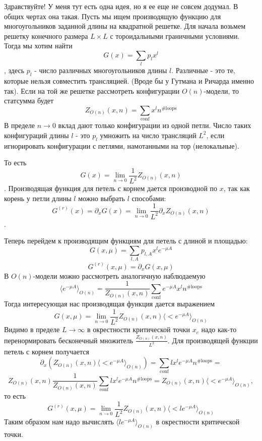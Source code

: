 \documentclass[12pt]{article}
\begin{document}
Здравствуйте!
У меня тут есть одна идея, но я ее еще не совсем додумал. В общих чертах
она такая. Пусть мы ищем производящую функцию для многоугольников
заданной длины на квадратной решетке. Для начала возьмем решетку
конечного размера $L\times L$ с тороидальными граничными условиями. Тогда мы
хотим найти 
$$G(x)=\sum_l p_l x^l$$,
здесь $p_l$ - число различных многоугольников длины $l$. Различные - это
те, которые нельзя совместить трансляцией. (Вроде бы у Гутмана и Ричарда
именно так). 
Если на той же решетке рассмотреть конфигурации $O(n)$-модели, то
статсумма будет
$$Z_{O(n)}(x,n)=\sum_{\mathrm{conf}} x^l n^{\#\mathrm{loops}}$$
В пределе $n\to 0$ вклад дают только конфигурации из одной петли. Число
таких конфигураций длины $l$ - это $p_l$ умножить на число трансляций
$L^2$, если игнорировать конфигурации с петлями, намотанными на тор
(нелокальные). 

То есть 
$$G(x)=\lim_{n\to 0} \frac{1}{L^2} Z_{O(n)}(x,n)$$. 
Производящая функция для петель с корнем дается производной по $x$, так
как корень у петли длины $l$ можно выбрать $l$ способами:
$$G^{(r)}(x)=\partial_x G(x) = \lim_{n\to 0} \frac{1}{L^2} \partial_x
Z_{O(n)} (x,n)$$.

Теперь перейдем к производящим функциям для петель с длиной и площадью:
$$G(x,\mu)=\sum_{l,A} p_{l,A} x^l e^{-\mu A}$$
$$G^{(r)}(x,\mu)=\partial_x G(x,\mu)$$
В $O(n)$-модели можно рассмотреть аналогичную наблюдаемую 
$$\langle e^{-\mu A} \rangle_{O(n)} = \frac{1}{Z_{O(n)} (x,n)}
\sum_{\mathrm{conf}} e^{-\mu A} x^l  n^{\#\mathrm{loops}}$$
Тогда интересующая нас производящая функция дается выражением
$$G(x,\mu)=\lim_{n\to 0} \frac{1}{L^2} Z_{O(n)}(x,n) \langle<e^{-\mu
A}\rangle_{O(n)}$$
Видимо в пределе $L\to \infty$ в окрестности критической точки $x_c$
надо как-то перенормировать бесконечный множитель
$\frac{Z_{O(n)}(x,n)}{L^2}$. 
Для производящей функции петель с корнем получается 
$$\partial_x \left( Z_{O(n)}(x,n) \langle<e^{-\mu
A}\rangle_{O(n)}\right) = \sum_{\mathrm{conf}} l x^l e^{-\mu A}
n^{\#\mathrm{loops}} = $$
$$Z_{O(n)}(x,n) \frac{1}{Z_{O(n)}(x,n)}
\sum_{\mathrm{conf}} l x^l e^{-\mu A} n^{\#\mathrm{loops}} =
Z_{O(n)}(x,n) \langle<e^{-\mu A}\rangle_{O(n)},$$
то есть 
$$G^{(r)}(x,\mu)=\lim_{n\to 0} \frac{1}{L^2} Z_{O(n)}(x,n) \langle<l
e^{-\mu A}\rangle_{O(n)}$$
Таким образом нам надо вычислять $\langle l e^{-\mu A}\rangle_{O(n)}$ в
окрестности критической точки. 
\end{document}
